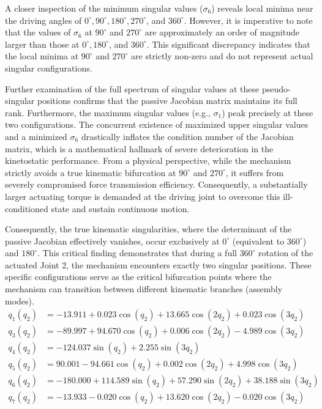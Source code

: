 \documentclass[a4paper,fleqn]{cas-sc}
\begin{document}
A closer inspection of the minimum singular values ($\sigma_6$) reveals local minima near the driving angles of $0^\circ, 90^\circ, 180^\circ, 270^\circ$, and $360^\circ$. However, it is imperative to note that the values of $\sigma_6$ at $90^\circ$ and $270^\circ$ are approximately an order of magnitude larger than those at $0^\circ, 180^\circ$, and $360^\circ$. This significant discrepancy indicates that the local minima at $90^\circ$ and $270^\circ$ are strictly non-zero and do not represent actual singular configurations. 

Further examination of the full spectrum of singular values at these pseudo-singular positions confirms that the passive Jacobian matrix maintains its full rank. Furthermore, the maximum singular values (e.g., $\sigma_1$) peak precisely at these two configurations. The concurrent existence of maximized upper singular values and a minimized $\sigma_6$ drastically inflates the condition number of the Jacobian matrix, which is a mathematical hallmark of severe deterioration in the kinetostatic performance. From a physical perspective, while the mechanism strictly avoids a true kinematic bifurcation at $90^\circ$ and $270^\circ$, it suffers from severely compromised force transmission efficiency. Consequently, a substantially larger actuating torque is demanded at the driving joint to overcome this ill-conditioned state and sustain continuous motion.

Consequently, the true kinematic singularities, where the determinant of the passive Jacobian effectively vanishes, occur exclusively at $0^\circ$ (equivalent to $360^\circ$) and $180^\circ$. This critical finding demonstrates that during a full $360^\circ$ rotation of the actuated Joint 2, the mechanism encounters exactly two singular positions. These specific configurations serve as the critical bifurcation points where the mechanism can transition between different kinematic branches (assembly modes).
\begin{equation}
\begin{aligned}
    q_1(q_2) &= -13.911 + 0.023\cos(q_2) + 13.665\cos(2q_2) + 0.023\cos(3q_2) \\
    q_3(q_2) &= -89.997 + 94.670\cos(q_2) + 0.006\cos(2q_2) - 4.989\cos(3q_2) \\
    q_4(q_2) &= -124.037\sin(q_2) + 2.255\sin(3q_2) \\
    q_5(q_2) &= 90.001 - 94.661\cos(q_2) + 0.002\cos(2q_2) + 4.998\cos(3q_2) \\
    q_6(q_2) &= -180.000 + 114.589\sin(q_2) + 57.290\sin(2q_2) + 38.188\sin(3q_2) \\
    q_7(q_2) &= -13.933 - 0.020\cos(q_2) + 13.620\cos(2q_2) - 0.020\cos(3q_2)
\end{aligned}
\end{equation}
\end{document}
